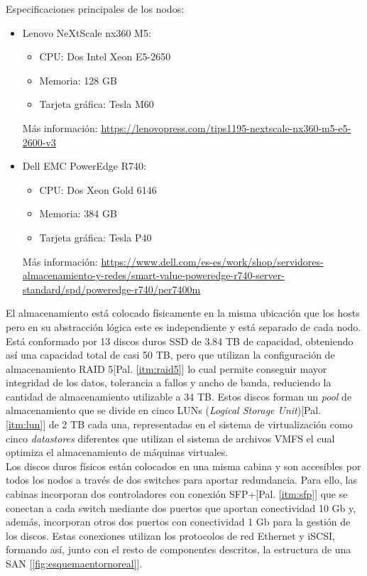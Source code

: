Especificaciones principales de los nodos:
\begin{itemize}
    \item Lenovo NeXtScale nx360 M5: 
        \begin{itemize}
            \item CPU: Dos Intel Xeon E5-2650
            \item Memoria: 128 GB
            \item Tarjeta  gráfica: Tesla M60
        \end{itemize}
            Más información: \url{https://lenovopress.com/tips1195-nextscale-nx360-m5-e5-2600-v3}
    \item Dell EMC PowerEdge R740:
        \begin{itemize}
            \item CPU: Dos Xeon Gold 6146
            \item Memoria: 384 GB
            \item Tarjeta gráfica: Tesla P40
        \end{itemize}
    Más información: \url{https://www.dell.com/es-es/work/shop/servidores-almacenamiento-y-redes/smart-value-poweredge-r740-server-standard/spd/poweredge-r740/per7400m}
\end{itemize}
El almacenamiento está colocado físicamente en la misma ubicación que los hosts pero en su abstracción lógica este es independiente y está separado de cada nodo. Está conformado por 13 discos duros SSD de 3.84 TB de capacidad, obteniendo así una capacidad total de casi 50 TB, pero que utilizan la configuración de almacenamiento RAID 5[Pal. \ref{itm:raid5}] lo cual permite conseguir mayor  integridad de los datos, tolerancia a fallos y ancho de banda, reduciendo la cantidad de almacenamiento utilizable a 34 TB. Estos discos forman un \textit{pool} de almacenamiento que se divide en cinco LUNs (\textit{Logical Storage Unit})[Pal. \ref{itm:lun}] de 2 TB cada una, representadas en el sistema de virtualización como cinco \textit{datastores} diferentes que utilizan el sistema de archivos VMFS el cual optimiza el almacenamiento de máquinas virtuales.\\
Los discos duros físicos están colocados en una misma cabina y son accesibles por todos los nodos a través de dos switches para aportar redundancia. Para ello, las cabinas incorporan dos controladores con conexión SFP+[Pal. \ref{itm:sfp}] que se conectan a cada switch mediante dos puertos que aportan conectividad 10 Gb y, además, incorporan otros dos puertos con conectividad 1 Gb para la gestión de los discos. Estas conexiones utilizan los protocolos de red Ethernet y iSCSI, formando así, junto con el resto de componentes descritos, la estructura de una SAN [\ref{fig:esquemaentornoreal}].\\

